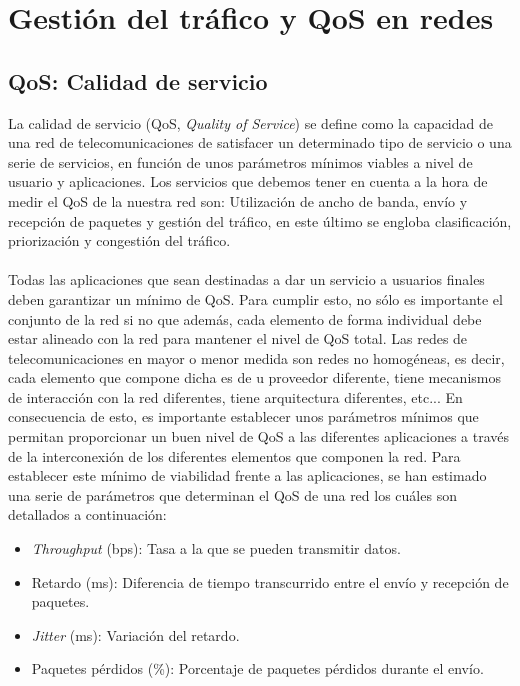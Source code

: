 \section{Gestión del tráfico y QoS en redes}

\subsection{QoS: Calidad de servicio}
La calidad de servicio (QoS, \textit{Quality of Service}) se define como la capacidad de una red de telecomunicaciones de satisfacer un determinado tipo de servicio o una serie de servicios, en función de unos parámetros mínimos viables a nivel de usuario y aplicaciones. Los servicios que debemos tener en cuenta a la hora de medir el QoS de la nuestra red son: Utilización de ancho de banda, envío y recepción de paquetes y gestión del tráfico, en este último se engloba clasificación, priorización y congestión del tráfico.\\\\

Todas las aplicaciones que sean destinadas a dar un servicio a usuarios finales deben garantizar un mínimo de QoS. Para cumplir esto, no sólo es importante el conjunto de la red si no que además, cada elemento de forma individual debe estar alineado con la red para mantener el nivel de QoS total. Las redes de telecomunicaciones en mayor o menor medida son redes no homogéneas, es decir, cada elemento que compone dicha es de u proveedor diferente, tiene mecanismos de interacción con la red diferentes, tiene arquitectura diferentes, etc... En consecuencia de esto, es importante establecer unos parámetros mínimos que permitan proporcionar un buen nivel de QoS a las diferentes aplicaciones a través de la interconexión de los diferentes elementos que componen la red. Para establecer este mínimo de viabilidad frente a las aplicaciones, se han estimado una serie de parámetros que determinan el QoS de una red los cuáles son detallados a continuación:

\begin{itemize}
    \item \textit{Throughput} (bps): Tasa a la que se pueden transmitir datos.
    \item Retardo (ms): Diferencia de tiempo transcurrido entre el envío y recepción de paquetes.
    \item \textit{Jitter} (ms): Variación del retardo.
    \item Paquetes pérdidos (\%): Porcentaje de paquetes pérdidos durante el envío.
\end{itemize}

